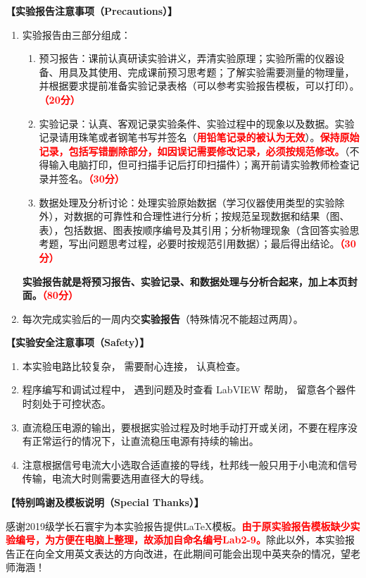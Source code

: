 \documentclass[dvipsnames, svgnames,a4paper,11pt]{article}
\begin{document}
	\textbf{【实验报告注意事项（Precautions）】}
	\begin{enumerate}
		\item 实验报告由三部分组成：
		\begin{enumerate}
			\item 预习报告：课前认真研读实验讲义，弄清实验原理；实验所需的仪器设备、用具及其使用、完成课前预习思考题；了解实验需要测量的物理量，并根据要求提前准备实验记录表格（可以参考实验报告模板，可以打印）。\textcolor{red}{\textbf{（20分）}}
			\item 实验记录：认真、客观记录实验条件、实验过程中的现象以及数据。实验记录请用珠笔或者钢笔书写并签名（\textcolor{red}{\textbf{用铅笔记录的被认为无效}}）。\textcolor{red}{\textbf{保持原始记录，包括写错删除部分，如因误记需要修改记录，必须按规范修改。}}（不得输入电脑打印，但可扫描手记后打印扫描件）；离开前请实验教师检查记录并签名。\textcolor{red}{\textbf{（30分）}}
			\item 数据处理及分析讨论：处理实验原始数据（学习仪器使用类型的实验除外），对数据的可靠性和合理性进行分析；按规范呈现数据和结果（图、表），包括数据、图表按顺序编号及其引用；分析物理现象（含回答实验思考题，写出问题思考过程，必要时按规范引用数据）；最后得出结论。\textcolor{red}{\textbf{（30分）}}
		\end{enumerate}
		\textbf{实验报告就是将预习报告、实验记录、和数据处理与分析合起来，加上本页封面。\textcolor{red}{（80分）}}
		\item 每次完成实验后的一周内交\textbf{实验报告}（特殊情况不能超过两周）。
	\end{enumerate}
	
	\textbf{【实验安全注意事项（Safety）】}	
	\begin{enumerate}
		\item 本实验电路比较复杂， 需要耐心连接， 认真检查。
		\item 程序编写和调试过程中， 遇到问题及时查看 LabVIEW 帮助， 留意各个器件时刻处于可控状态。
		\item 直流稳压电源的输出，要根据实验过程及时地手动打开或关闭，不要在程序没有正常运行的情况下，让直流稳压电源有持续的输出。
		\item 注意根据信号电流大小选取合适直接的导线，杜邦线一般只用于小电流和信号传输，电流大时则需要选用直径大的导线。
	\end{enumerate}
	
	
	\textbf{【特别鸣谢及模板说明（Special Thanks）】}	
	
	感谢2019级学长石寰宇为本实验报告提供\LaTeX 模板。\textcolor{red}{\textbf{由于原实验报告模板缺少实验编号，为方便在电脑上整理，故添加自命名编号Lab2-9。}}除此以外，本实验报告正在向全文用英文表达的方向改进，在此期间可能会出现中英夹杂的情况，望老师海涵！
	
\end{document}
